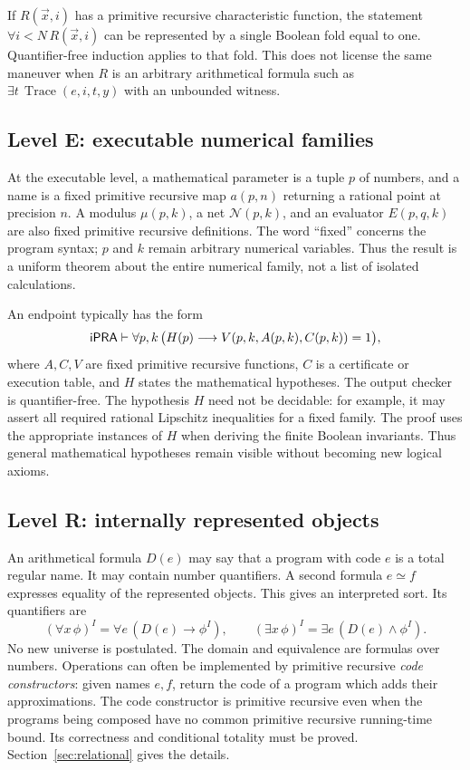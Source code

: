 If $R(\vec x,i)$ has a primitive recursive characteristic function, the statement
$\forall i<N\,R(\vec x,i)$ can be represented by a single Boolean fold equal
to one. Quantifier-free induction applies to that fold. This does not license
the same maneuver when $R$ is an arbitrary arithmetical formula such as
$\exists t\,\operatorname{Trace}(e,i,t,y)$ with an unbounded witness.

\subsection{Level E: executable numerical families}

At the executable level, a mathematical parameter is a tuple $p$ of numbers,
and a name is a fixed primitive recursive map $a(p,n)$ returning a rational
point at precision $n$. A modulus $\mu(p,k)$, a net $\mathcal N(p,k)$, and an
evaluator $E(p,q,k)$ are also fixed primitive recursive definitions. The word
``fixed'' concerns the program syntax; $p$ and $k$ remain arbitrary numerical
variables. Thus the result is a uniform theorem about the entire numerical
family, not a list of isolated calculations.

An endpoint typically has the form
\begin{equation}\label{eq:ep}
 \mathsf{iPRA}\vdash\forall p,k\,
   \bigl(H(p)\longrightarrow
   V(p,k,A(p,k),C(p,k))=1\bigr),
\end{equation}
where $A,C,V$ are fixed primitive recursive functions, $C$ is a certificate
or execution table, and $H$ states the mathematical hypotheses. The output
checker is quantifier-free. The hypothesis $H$ need not be decidable: for
example, it may assert all required rational Lipschitz inequalities for a
fixed family. The proof uses the appropriate instances of $H$ when deriving
the finite Boolean invariants. Thus general mathematical hypotheses remain
visible without becoming new logical axioms.

\subsection{Level R: internally represented objects}

An arithmetical formula $D(e)$ may say that a program with code $e$ is a
total regular name. It may contain number quantifiers. A second formula
$e\simeq f$ expresses equality of the represented objects. This gives an
interpreted sort. Its quantifiers are
\[
 (\forall x\,\phi)^I=\forall e\,(D(e)\to\phi^I),\qquad
 (\exists x\,\phi)^I=\exists e\,(D(e)\land\phi^I).
\]
No new universe is postulated. The domain and equivalence are formulas over
numbers. Operations can often be implemented by primitive recursive
\emph{code constructors}: given names $e,f$, return the code of a program
which adds their approximations. The code constructor is primitive recursive
even when the programs being composed have no common primitive recursive
running-time bound. Its correctness and conditional totality must be proved.
Section~\ref{sec:relational} gives the details.

